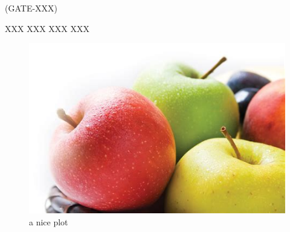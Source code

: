 

  \question  (GATE-XXX)

  \begin{choices}
    \choice XXX
    \choice XXX
    \choice XXX
    \choice XXX
  \end{choices}


       \begin{figure}[h]
            \centering
            \includegraphics{./images/apple.jpeg}
            \caption{a nice plot}
            \label{fig:mesh1}
        \end{figure}






